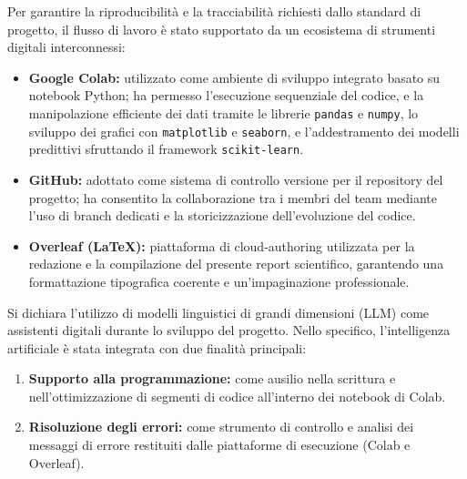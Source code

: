 \documentclass[11pt,a4paper]{article}
\begin{document}
Per garantire la riproducibilità e la tracciabilità richiesti dallo standard di progetto, il flusso di lavoro è stato supportato da un ecosistema di strumenti digitali interconnessi:
\begin{itemize}
    \item \textbf{Google Colab:} utilizzato come ambiente di sviluppo integrato basato su notebook Python; ha permesso l'esecuzione sequenziale del codice, e la manipolazione efficiente dei dati tramite le librerie \texttt{pandas} e \texttt{numpy}, lo sviluppo dei grafici con \texttt{matplotlib} e \texttt{seaborn}, e l'addestramento dei modelli predittivi sfruttando il framework \texttt{scikit-learn}.
    \item \textbf{GitHub:} adottato come sistema di controllo versione per il repository del progetto; ha consentito la collaborazione tra i membri del team mediante l'uso di branch dedicati e la storicizzazione dell'evoluzione del codice.
    \item \textbf{Overleaf (LaTeX):} piattaforma di cloud-authoring utilizzata per la redazione e la compilazione del presente report scientifico, garantendo una formattazione tipografica coerente e un'impaginazione professionale.
\end{itemize}


Si dichiara l'utilizzo di modelli linguistici di grandi dimensioni (LLM) come assistenti digitali durante lo sviluppo del progetto. Nello specifico, l'intelligenza artificiale è stata integrata con due finalità principali:
\begin{enumerate}
    \item \textbf{Supporto alla programmazione:} come ausilio nella scrittura e nell'ottimizzazione di segmenti di codice all'interno dei notebook di Colab.
    \item \textbf{Risoluzione degli errori:} come strumento di controllo e analisi dei messaggi di errore restituiti dalle piattaforme di esecuzione (Colab e Overleaf).
\end{enumerate}
\end{document}
